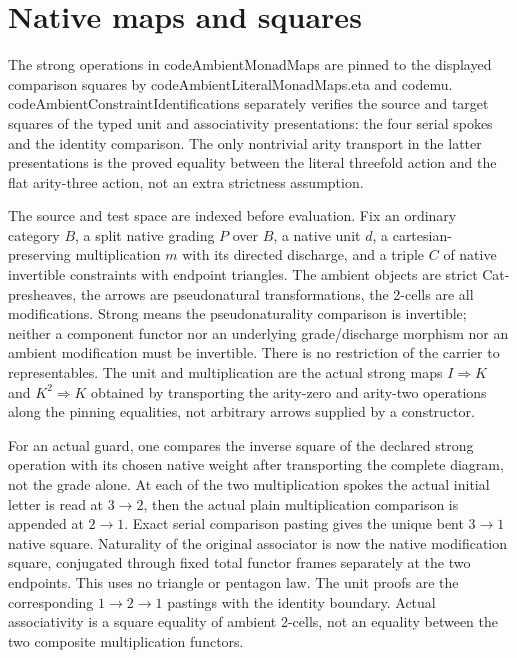 \documentclass[11pt]{article}
\begin{document}
\section*{Native maps and squares}
The strong operations in code{AmbientMonadMaps} are pinned to the displayed comparison squares by code{AmbientLiteralMonadMaps.eta} and code{mu}. code{AmbientConstraintIdentifications} separately verifies the source and target squares of the typed unit and associativity presentations: the four serial spokes and the identity comparison. The only nontrivial arity transport in the latter presentations is the proved equality between the literal threefold action and the flat arity-three action, not an extra strictness assumption.

The source and test space are indexed before evaluation. Fix an ordinary category $B$, a split native grading $P$ over $B$, a native unit $d$, a cartesian-preserving multiplication $m$ with its directed discharge, and a triple $C$ of native invertible constraints with endpoint triangles. The ambient objects are strict Cat-presheaves, the arrows are pseudonatural transformations, the 2-cells are all modifications. Strong means the pseudonaturality comparison is invertible; neither a component functor nor an underlying grade/discharge morphism nor an ambient modification must be invertible. There is no restriction of the carrier to representables. The unit and multiplication are the actual strong maps $I\Rightarrow K$ and $K^2\Rightarrow K$ obtained by transporting the arity-zero and arity-two operations along the pinning equalities, not arbitrary arrows supplied by a constructor.

For an actual guard, one compares the inverse square of the declared strong operation with its chosen native weight after transporting the complete diagram, not the grade alone. At each of the two multiplication spokes the actual initial letter is read at $3\to2$, then the actual plain multiplication comparison is appended at $2\to1$. Exact serial comparison pasting gives the unique bent $3\to1$ native square. Naturality of the original associator is now the native modification square, conjugated through fixed total functor frames separately at the two endpoints. This uses no triangle or pentagon law. The unit proofs are the corresponding $1\to2\to1$ pastings with the identity boundary. Actual associativity is a square equality of ambient 2-cells, not an equality between the two composite multiplication functors.
\end{document}
